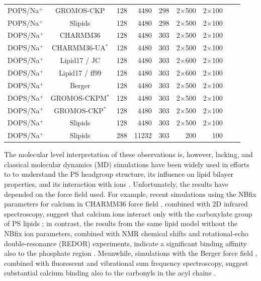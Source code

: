 \documentclass[aps,prl,superscriptaddress,twocolumn]{revtex4}
\begin{document}
\begin{table}[htb]
\begin{tabular}{lcrrrrrcc}
POPS/Na$^{+}$  & GROMOS-CKP \cite{Chandrasekhar03,kukol09,piggot12} & 128  & 4480  & 298  & 2$\times$500  & 2$\times$100  & \cite{ckp2POPS303K}  & \tabularnewline
POPS/Na$^{+}$  & Slipids \cite{jambeck13}  & 128  & 4480  & 298  & 2$\times$500  & 2$\times$100  & \cite{slipidsPOPS298K}  & \tabularnewline
\hline 
DOPS/Na$^{+}$  & CHARMM36 \cite{venable13}  & 128  & 4480  & 303  & 2$\times$500  & 2$\times$100  & \cite{charmm36DOPS303K}  & \tabularnewline
DOPS/Na$^{+}$  & CHARMM36-UA$^*$ \cite{venable13,lee14} & 128  & 4480  & 303  & 2$\times$500  & 2$\times$100  & \cite{charmm36uaDOPS303K}  & \tabularnewline
DOPS/Na$^{+}$  & Lipid17 \cite{gould18} / JC \cite{joung08}  & 128  & 4480  & 303  & 2$\times$600  & 2$\times$100  & \cite{lipid17DOPSjcions}  & \tabularnewline
DOPS/Na$^{+}$  & Lipid17 \cite{gould18} / ff99 \cite{aqvist90}  & 128  & 4480  & 303  & 2$\times$600  & 2$\times$100  & \cite{lipid17DOPSff99ions}  & \tabularnewline
DOPS/Na$^{+}$  & Berger \cite{mukhopadhyay04}  & 128  & 4480  & 303  & 2$\times$500  & 2$\times$100  & \cite{bergerDOPS303K}  & \tabularnewline
DOPS/Na$^{+}$  & GROMOS-CKPM$^*$ \cite{piggot12} & 128  & 4480  & 303  & 2$\times$500  & 2$\times$100  & \cite{ckp1DOPS303K}  & \tabularnewline
DOPS/Na$^{+}$  & GROMOS-CKP$^*$ \cite{piggot12}  & 128  & 4480  & 303  & 2$\times$500  & 2$\times$100  & \cite{ckp2DOPS303K}  & \tabularnewline
DOPS/Na$^{+}$  & Slipids \cite{jambeck13}  & 128  & 4480  & 303  & 2$\times$500  & 2$\times$100  & \cite{slipidsDOPS303K}  & \tabularnewline
DOPS/Na$^{+}$  & Slipids \cite{jambeck13}  & 288  & 11232  & 303  & 200  & 100  & \cite{slipidsDOPSfiles}  & \tabularnewline
\end{tabular}
\end{table}


The molecular level interpretation of these observations is,
however, lacking, and  classical molecular dynamics (MD) simulations have been widely used in efforts to
to understand the PS headgroup structure, its influence on lipid bilayer properties, and its
interaction with
ions \cite{cascales96,pandit02,mukhopadhyay04,pedersen06,vernier09,boettcher11,molina12,jurkiewicz12,venable13,pan14,vangaveti14,melcrova16,valentine18,hallock18}.
Unfortunately, the results have depended on the force field used.
For example, recent simulations using the NBfix parameters for calcium \cite{kim16} in
CHARMM36 force field \cite{klauda10,venable13}, combined with 2D infrared spectroscopy,
suggest that calcium ions interact only with the carboxylate group of PS lipids \cite{valentine18}; in contrast,
the results from the same lipid model without the NBfix ion parameters, combined with NMR chemical shifts and
rotational-echo double-resonance (REDOR) experiments, indicate a significant binding affinity also to the phosphate region \cite{hallock18}.
Meanwhile, simulations with the Berger force field \cite{berger97,mukhopadhyay04},
combined with fluorescent and vibrational sum frequency spectroscopy, suggest substantial
calcium binding also to the carbonyls in the acyl chains \cite{melcrova16}.
\end{document}
